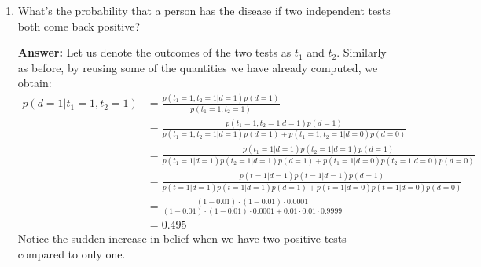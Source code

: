 \documentclass{article}
\newenvironment{QandA}{\begin{enumerate}[label=\arabic*.]}{\end{enumerate}}
\newenvironment{InnerQandA}{\begin{enumerate}[label=\roman*.]}{\end{enumerate}}
\newenvironment{answer}{\par\normalfont \textbf{Answer:}}{}
\newcommand{\g}{\vert}
\begin{document}
\begin{QandA}
\begin{InnerQandA}
        \item What’s the probability that a person has the disease if two independent tests both come back positive?
        \begin{answer}
            Let us denote the outcomes of the two tests as $t_1$ and $t_2$. Similarly as before, by reusing some of the quantities we have already computed, we obtain:
            \begin{align*}
                p(d = 1 \g t_1 = 1, t_2 = 1) 
                &= \frac{p(t_1 = 1, t_2 = 1 \g d=1) p(d=1)}{p(t_1 = 1, t_2 = 1)} \\
                &= \frac{p(t_1 = 1, t_2 = 1 \g d=1) p(d=1)}{p(t_1 = 1, t_2 = 1 \g d = 1)p(d=1)+ p(t_1 = 1, t_2 = 1 \g d = 0)p(d=0)} \\
                &= \frac{p(t_1 = 1 \g d=1) p(t_2 = 1 \g d=1) p(d=1)}{p(t_1 = 1 \g d=1) p(t_2 = 1 \g d=1) p(d=1) + p(t_1 = 1 \g d=0) p(t_2 = 1 \g d=0) p(d=0)} \\
                &= \frac{p(t = 1 \g d=1) p(t = 1 \g d=1) p(d=1)}{p(t = 1 \g d=1) p(t = 1 \g d=1) p(d=1) + p(t = 1 \g d=0) p(t = 1 \g d=0) p(d=0)} \\
                &= \frac{(1 - 0.01) \cdot (1-0.01) \cdot 0.0001}{(1 - 0.01) \cdot (1-0.01) \cdot 0.0001 + 0.01 \cdot 0.01 \cdot 0.9999} \\
                &= 0.495
            \end{align*}
        Notice the sudden increase in belief when we have two positive tests compared to only one.
        \end{answer}
    \end{InnerQandA}


\end{QandA}
\end{document}
